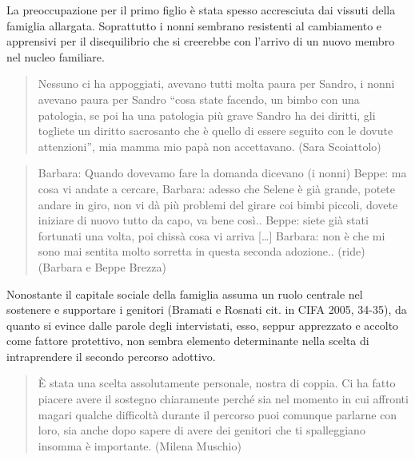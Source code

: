 \documentclass[12pt,oneside,svgnames]{memoir}
\newenvironment{quotationb}%
{\color{maincolor}\begin{leftbar}\begin{quotation}}%
{\end{quotation}\end{leftbar}\ignorespacesafterend}
\begin{document}
La preoccupazione per il primo figlio è stata spesso accresciuta dai
vissuti della famiglia allargata. Soprattutto i nonni sembrano
resistenti al cambiamento e apprensivi per il disequilibrio che si
creerebbe con l'arrivo di un nuovo membro nel nucleo familiare.

\begin{quotationb}
Nessuno ci ha appoggiati, avevano tutti molta paura per Sandro, i nonni
avevano paura per Sandro ``cosa state facendo, un bimbo con una
patologia, se poi ha una patologia più grave Sandro ha dei diritti, gli
togliete un diritto sacrosanto che è quello di essere seguito con le
dovute attenzioni'', mia mamma mio papà non accettavano. (Sara
Scoiattolo)
\end{quotationb}

\begin{quotationb}
Barbara: Quando dovevamo fare la domanda dicevano (i nonni) Beppe: ma
cosa vi andate a cercare, Barbara: adesso che Selene è già grande,
potete andare in giro, non vi dà più problemi del girare coi bimbi
piccoli, dovete iniziare di nuovo tutto da capo, va bene così.. Beppe:
siete già stati fortunati una volta, poi chissà cosa vi arriva
{[}\ldots{}{]} Barbara: non è che mi sono mai sentita molto sorretta in
questa seconda adozione.. (ride) (Barbara e Beppe Brezza)
\end{quotationb}

Nonostante il capitale sociale della famiglia assuma un ruolo centrale
nel sostenere e supportare i genitori (Bramati e Rosnati cit. in CIFA
2005, 34-35), da quanto si evince dalle parole degli intervistati, esso,
seppur apprezzato e accolto come fattore protettivo, non sembra elemento
determinante nella scelta di intraprendere il secondo percorso adottivo.

\begin{quotationb}
È stata una scelta assolutamente personale, nostra di coppia. Ci ha
fatto piacere avere il sostegno chiaramente perché sia nel momento in
cui affronti magari qualche difficoltà durante il percorso puoi comunque
parlarne con loro, sia anche dopo sapere di avere dei genitori che ti
spalleggiano insomma è importante. (Milena Muschio)
\end{quotationb}
\end{document}
